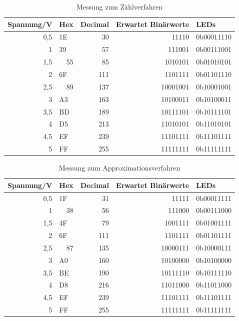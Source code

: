 \documentclass[12pt,a4paper]{article}
\begin{document}
\begin{table}[htbp]
\begin{center}
\begin{tabular}{|r|l|r|r|l|}
\hline
\multicolumn{1}{|l|}{Spannung/V} & Hex & \multicolumn{1}{l|}{Decimal} & \multicolumn{1}{l|}{Erwartet Binärwerte} & LEDs \\ \hline
0,5 & 1E & 30 & 11110 & 0b00011110 \\ \hline
1 & 39 & 57 & 111001 & 0b00111001 \\ \hline
1,5 & \multicolumn{1}{r|}{55} & 85 & 1010101 & 0b01010101 \\ \hline
2 & 6F & 111 & 1101111 & 0b01101110 \\ \hline
2,5 & \multicolumn{1}{r|}{89} & 137 & 10001001 & 0b10001001 \\ \hline
3 & A3 & 163 & 10100011 & 0b10100011 \\ \hline
3,5 & BD & 189 & 10111101 & 0b10111101 \\ \hline
4 & D5 & 213 & 11010101 & 0b11010101 \\ \hline
4,5 & EF & 239 & 11101111 & 0b11101111 \\ \hline
5 & FF & 255 & 11111111 & 0b11111111 \\ \hline
\end{tabular}
\end{center}
\caption{Messung zum Zählverfahren}
\label{tab:zaehl}
\end{table}

\begin{table}[htbp]
\begin{center}
\begin{tabular}{|r|l|r|r|l|}
\hline
\multicolumn{1}{|l|}{Spannung/V} & Hex & \multicolumn{1}{l|}{Decimal} & \multicolumn{1}{l|}{Erwartet Binärwerte} & LEDs \\ \hline
0,5 & 1F & 31 & 11111 & 0b00011111 \\ \hline
1 & \multicolumn{1}{r|}{38} & 56 & 111000 & 0b00111000 \\ \hline
1,5 & 4F & 79 & 1001111 & 0b01001111 \\ \hline
2 & 6F & 111 & 1101111 & 0b01101111 \\ \hline
2,5 & \multicolumn{1}{r|}{87} & 135 & 10000111 & 0b10000111 \\ \hline
3 & A0 & 160 & 10100000 & 0b10100000 \\ \hline
3,5 & BE & 190 & 10111110 & 0b10111110 \\ \hline
4 & D8 & 216 & 11011000 & 0b11011000 \\ \hline
4,5 & EF & 239 & 11101111 & 0b11101111 \\ \hline
5 & FF & 255 & 11111111 & 0b11111111 \\ \hline
\end{tabular}
\end{center}
\caption{Messung zum Approximationsverfahren}
\label{tab:approx}
\end{table}
\end{document}
